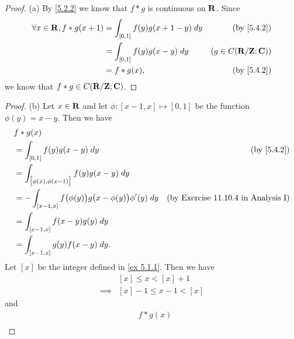\begin{proof}{(a)}
  By \cref{5.2.2} we know that \(f * g\) is continuous on \(\mathbf{R}\).
  Since
  \begin{align*}
    \forall x \in \R, f * g(x + 1) & = \int_{[0, 1]} f(y) g(x + 1 - y) \; dy & \text{(by \cref{5.4.2})} \\
                                   & = \int_{[0, 1]} f(y) g(x - y) \; dy     & (g \in C(\R / \Z ; \C))  \\
                                   & = f * g(x),                             & \text{(by \cref{5.4.2})}
  \end{align*}
  we know that \(f * g \in C(\mathbf{R} / \mathbf{Z} ; \mathbf{C})\).
\end{proof}

\begin{proof}{(b)}
  Let \(x \in \mathbf{R}\) and let \(\phi : [x - 1, x] \mapsto [0, 1]\) be the function \(\phi(y) = x - y\).
  Then we have
  \begin{align*}
     & f * g(x)                                                                                                                   \\
     & = \int_{[0, 1]} f(y) g(x - y) \; dy                                           & \text{(by \cref{5.4.2})}                   \\
     & = \int_{\big[\phi(x), \phi(x - 1)\big]} f(y) g(x - y) \; dy                                                                \\
     & = -\int_{[x - 1, x]} f\big(\phi(y)\big) g\big(x - \phi(y)\big) \phi'(y) \; dy & \text{(by Exercise 11.10.4 in Analysis I)} \\
     & = \int_{[x - 1, x]} f(x - y) g(y) \; dy                                                                                    \\
     & = \int_{[x - 1, x]} g(y) f(x - y) \; dy.                                                                                   \\
  \end{align*}
  Let \([x]\) be the integer defined in \cref{ex 5.1.1}.
  Then we have
  \begin{align*}
             & [x] \leq x < [x] + 1     \\
    \implies & [x] - 1 \leq x - 1 < [x]
  \end{align*}
  and
  \begin{align*}
     & f * g(x)                                                                                                                     \\

\end{align*}
\end{proof}
